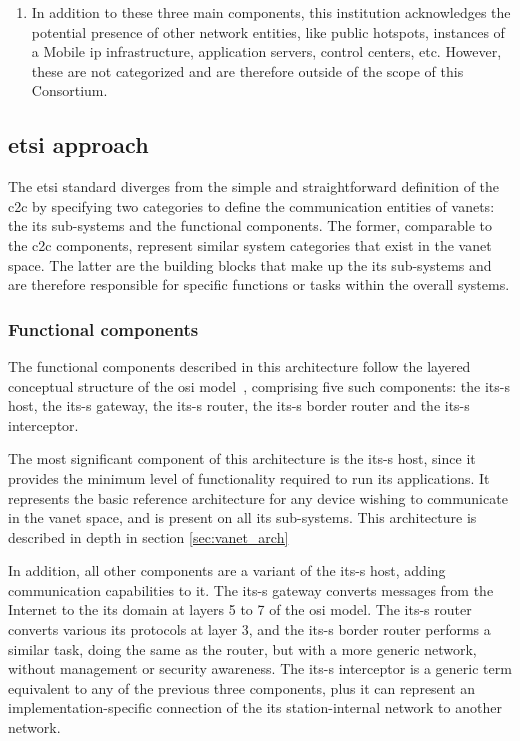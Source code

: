 \begin{enumerate}
    \item In addition to these three main components, this institution acknowledges the potential presence of other network entities, like public hotspots, instances of a Mobile \gls{ip} infrastructure, application servers, control centers, etc. However, these are not categorized and are therefore outside of the scope of this Consortium.

\end{enumerate}

\subsection[ETSI approach]{\gls{etsi} approach}

The \gls{etsi} standard diverges from the simple and straightforward definition of the \gls{c2c} by specifying two categories to define the communication entities of \glspl{vanet}: the \gls{its} sub-systems and the functional components. The former, comparable to the \gls{c2c} components, represent similar system categories that exist in the \gls{vanet} space. The latter are the building blocks that make up the \gls{its} sub-systems and are therefore responsible for specific functions or tasks within the overall systems.

\subsubsection{Functional components}

The functional components described in this architecture follow the layered conceptual structure of the \gls{osi} model~\cite{etsi_intelligent_2010}, comprising five such components: the \gls{its-s} host, the \gls{its-s} gateway, the \gls{its-s} router, the \gls{its-s} border router and the \gls{its-s} interceptor.

The most significant component of this architecture is the \gls{its-s} host, since it provides the minimum level of functionality required to run \gls{its} applications. It represents the basic reference architecture for any device wishing to communicate in the \gls{vanet} space, and is present on all \gls{its} sub-systems. This architecture is described in depth in section \ref{sec:vanet_arch} 

In addition, all other components are a variant of the \gls{its-s} host, adding communication capabilities to it. The \gls{its-s} gateway converts messages from the Internet to the \gls{its} domain at layers 5 to 7 of the \gls{osi} model. The \gls{its-s} router converts various \gls{its} protocols at layer 3, and the \gls{its-s} border router performs a similar task, doing the same as the router, but with a more generic network, without management or security awareness. The \gls{its-s} interceptor is a generic term equivalent to any of the previous three components, plus it can represent an implementation-specific connection of the \gls{its} station-internal network to another network.

